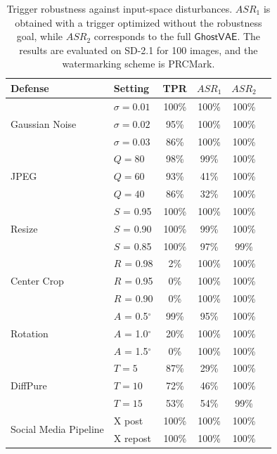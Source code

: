 \documentclass[letterpaper,twocolumn,10pt]{article}
\newcommand{\mg}{$\mathsf{GhostVAE}$\xspace}
\begin{document}
\begin{table}[t]
\centering
\caption{Trigger robustness against input-space disturbances. 
$ASR_1$ is obtained with a trigger optimized without the robustness goal, while $ASR_2$ corresponds to the full \mg.
The results are evaluated on SD-2.1 for 100 images, and the watermarking scheme is PRCMark.
}
\label{tab:input_mitigation_robustness}
\setlength{\tabcolsep}{4pt}
\renewcommand{\arraystretch}{1.15}
\begin{tabular}{llcccc}
\toprule
Defense & Setting & TPR & $ASR_1$ & $ASR_2$ \\
\midrule
\multirow{3}{*}{Gaussian Noise} 
& $\sigma=0.01$ & 100\% & 100\% & 100\% \\
& $\sigma=0.02$ & 95\% & 100\% & 100\% \\
& $\sigma=0.03$ & 86\% & 100\% & 100\% \\
\midrule
\multirow{3}{*}{JPEG}
& $Q=80$ & 98\% & 99\% & 100\% \\
& $Q=60$ & 93\% & 41\% & 100\% \\
& $Q=40$ & 86\% & 32\% & 100\% \\
\midrule
\multirow{3}{*}{Resize}
& $S$ = 0.95 & 100\%& 100\% & 100\% \\
& $S$ = 0.90 & 100\%& 99\% & 100\% \\
& $S$ = 0.85 & 100\%& 97\% & 99\% \\
\midrule
\multirow{3}{*}{Center Crop}
& $R$ = 0.98 & 2\% & 100\%& 100\% \\
& $R$ = 0.95 & 0\% & 100\%& 100\% \\
& $R$ = 0.90 & 0\% & 100\%& 100\% \\
\midrule
\multirow{3}{*}{Rotation}
& $A$ = 0.5$^\circ$ & 99\%& 95\% & 100\% \\
& $A$ = 1.0$^\circ$ & 20\%& 100\% & 100\% \\
& $A$ = 1.5$^\circ$ & 0\% & 100\%& 100\% \\
\midrule
\multirow{3}{*}{DiffPure~\cite{DBLP:conf/icml/NieGHXVA22}}
& $T=5$  & 87\% & 29\% & 100\% \\
& $T=10$ & 72\% & 46\% & 100\% \\
& $T=15$ & 53\% & 54\% & 99\% \\
\midrule
\multirow{2}{*}{Social Media Pipeline}
& X post & 100\%& 100\% & 100\% \\
& X repost & 100\%& 100\% & 100\% \\
\bottomrule
\end{tabular}
\end{table}
\end{document}
